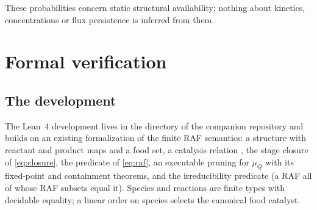 \documentclass[11pt,a4paper]{article}
\theoremstyle{plain}
\theoremstyle{definition}
\theoremstyle{remark}
\newcommand{\muQ}{\mu_Q}
\begin{document}
These probabilities concern static structural availability; nothing about kinetics, concentrations or flux persistence is inferred from them.

\section{Formal verification}\label{sec:formal}

\subsection{The development}

The Lean~4 development \cite{demoura2021lean4,mathlib2020} lives in the directory  of the companion repository \cite{repository2026} and builds on an existing formalization of the finite RAF semantics: a structure  with reactant and product maps and a food set, a catalysis relation , the stage closure  of \eqref{eq:closure}, the predicate  of \eqref{eq:raf}, an executable pruning  for $\muQ$ with its fixed-point and containment theorems, and the irreducibility predicate  (a RAF all of whose RAF subsets equal it). Species and reactions are finite types with decidable equality; a linear order on species selects the canonical food catalyst.
\end{document}
